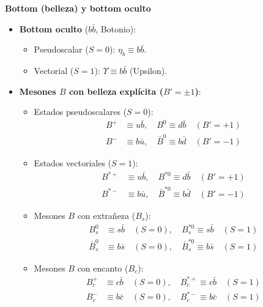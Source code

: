\textbf{Bottom (belleza) y bottom oculto}
\begin{itemize}
    \item \textbf{Bottom oculto} ($b\bar{b}$, Botonio):
    \begin{itemize}
        \item Pseudoscalar ($S = 0$): $\eta_b \equiv b\bar{b}$.
        \item Vectorial ($S = 1$): $\Upsilon \equiv b\bar{b}$ (Upsilon).
    \end{itemize}
    \item \textbf{Mesones $B$ con belleza explícita ($B' = \pm 1$)}:
    \begin{itemize}
        \item Estados pseudoscalares ($S = 0$):
        \begin{align}
            B^+ &\equiv u\bar{b}, \quad B^0 \equiv d\bar{b} \quad (B' = +1) \\
            B^- &\equiv b\bar{u}, \quad \bar{B}^0 \equiv b\bar{d} \quad (B' = -1)
        \end{align}
        \item Estados vectoriales ($S = 1$):
        \begin{align}
            B^{*+} &\equiv u\bar{b}, \quad B^{*0} \equiv d\bar{b} \quad (B' = +1) \\
            B^{*-} &\equiv b\bar{u}, \quad \bar{B}^{*0} \equiv b\bar{d} \quad (B' = -1)
        \end{align}
        \item Mesones $B$ con extrañeza ($B_s$):
        \begin{align}
            B_s^0 &\equiv s\bar{b} \quad (S=0), \quad B_s^{*0} \equiv s\bar{b} \quad (S=1) \\
            \bar{B}_s^0 &\equiv b\bar{s} \quad (S=0), \quad \bar{B}_s^{*0} \equiv b\bar{s} \quad (S=1)
        \end{align}
        \item Mesones $B$ con encanto ($B_c$):
        \begin{align}
            B_c^+ &\equiv c\bar{b} \quad (S=0), \quad B_c^{*+} \equiv c\bar{b} \quad (S=1) \\
            B_c^- &\equiv b\bar{c} \quad (S=0), \quad B_c^{*-} \equiv b\bar{c} \quad (S=1)
        \end{align}
    \end{itemize}
\end{itemize}

\newpage


